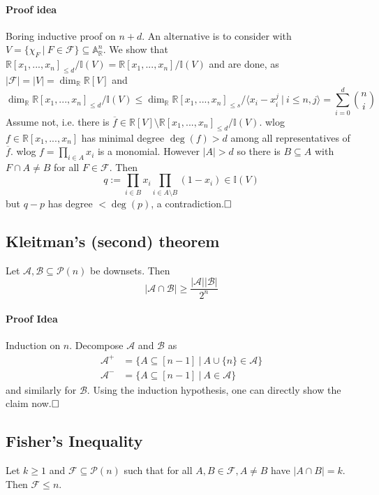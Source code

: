 \documentclass{scrartcl}
\newcommand{\R}{\mathbb{R}}
\newcommand{\I}{\mathbb{I}}
\begin{document}
\paragraph{Proof idea} Boring inductive proof on $n + d$. An alternative is to consider with $V = \{ \chi_F \ | \ F \in \mathcal{F} \} \subseteq \mathbb{A}^n_\R$.
We show that $\R[x_1, ..., x_n]_{\leq d} / \I(V) = \R[x_1, ..., x_n] / \I(V)$ and are done, as $|\mathcal{F}| = |V| = \dim_\R \R[V]$ and
\begin{equation*}
    \dim_\R \R[x_1, ..., x_n]_{\leq d}/\I(V) \leq \dim_\R \R[x_1, ..., x_n]_{\leq s} / \langle x_i - x_i^j \ | \ i \leq n, j \rangle = \sum_{i = 0}^d {n \choose i}
\end{equation*}
Assume not, i.e. there is $\overline{f} \in \R[V] \setminus \R[x_1, ..., x_n]_{\leq d} / \I(V)$.
wlog $f \in \R[x_1, ..., x_n]$ has minimal degree $\deg(f) > d$ among all representatives of $\overline{f}$.
wlog $f = \prod_{i \in A} x_i$ is a monomial.
However $|A| > d$ so there is $B \subseteq A$ with $F \cap A \neq B$ for all $F \in \mathcal{F}$.
Then
\begin{equation*}
    q := \prod_{i \in B} x_i \prod_{i \in A \setminus B} (1 - x_i) \in \I(V)
\end{equation*}
but $q - p$ has degree $< \deg(p)$, a contradiction.$\hfill\square$

\subsection{Kleitman's (second) theorem}
Let $\mathcal{A}, \mathcal{B} \subseteq \mathcal{P}(n)$ be downsets. 
Then
\begin{equation*}
    |\mathcal{A} \cap \mathcal{B}| \geq \frac {|\mathcal{A}| |\mathcal{B}|} {2^n}
\end{equation*}
\paragraph{Proof Idea} Induction on $n$. Decompose $\mathcal{A}$ and $\mathcal{B}$ as
\begin{align*}
    \mathcal{A}^+ &= \{ A \subseteq [n - 1] \ | \ A \cup \{n\} \in \mathcal{A} \} \\
    \mathcal{A}^- &= \{ A \subseteq [n - 1] \ | \ A \in \mathcal{A} \}
\end{align*}
and similarly for $\mathcal{B}$. Using the induction hypothesis, one can directly show the claim now.$\hfill\square$

\subsection{Fisher's Inequality}
Let $k \geq 1$ and $\mathcal{F} \subseteq \mathcal{P}(n)$ such that for all $A, B \in \mathcal{F}, A \neq B$ have $|A \cap B| = k$. Then $\mathcal{F} \leq n$.
\end{document}
